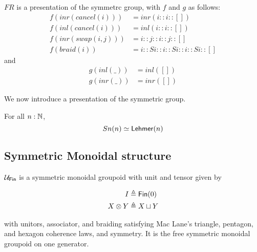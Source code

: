 \begin{proposition}
  $FR$ is a presentation of the symmetrc group, with $f$ and $g$ as follows:
  \begin{align*}
    f (inr (cancel (i))) & = inr (i :: i :: [])                     \\
    f (inl (cancel (i))) & = inl (i :: i :: [])                     \\
    f (inr (swap (i,j))) & = i :: j :: i :: j :: []                 \\
    f (braid (i))        & = i :: S i :: i :: S i :: i :: S i :: []
  \end{align*}
  and
  \begin{align*}
    g (inl (\_)) & = inl ([]) \\
    g (inr (\_)) & = inr ([])
  \end{align*}
\end{proposition}

We now introduce a presentation of the symmetric group.


\begin{theorem}
  For all $n : \mathbb{N}$,
  \[
    Sn(n) \eqv \Lehmer[n]
  \]
\end{theorem}

\subsection{Symmetric Monoidal structure}

$\UFin$ is a symmetric monoidal groupoid with unit and tensor given by

\begin{definition}
  \begin{align*}
    I           & \defeq \Fin[0]    \\
    X \otimes Y & \defeq X \sqcup Y
  \end{align*}
\end{definition}

with unitors, associator, and braiding satisfying Mac Lane's triangle, pentagon, and hexagon coherence laws, and
symmetry. It is the free symmetric monoidal groupoid on one generator.

